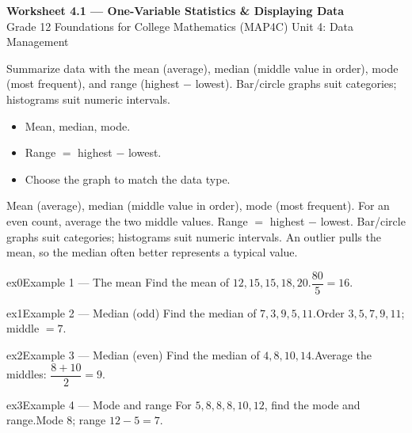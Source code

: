 \documentclass[11pt]{article}
\begin{document}
\begin{center}
{\LARGE\bfseries\color{titleblue}Worksheet 4.1 --- One-Variable Statistics \& Displaying Data}\\[2pt]
{\small Grade 12 Foundations for College Mathematics (MAP4C) \textperiodcentered{} Unit 4: Data Management}
\end{center}

\begin{ideabox}
Summarize data with the mean (average), median (middle value in order), mode (most frequent), and range (highest $-$ lowest). Bar/circle graphs suit categories; histograms suit numeric intervals.
\begin{itemize}[leftmargin=*,itemsep=2pt]
  \item Mean, median, mode.
  \item Range $=$ highest $-$ lowest.
  \item Choose the graph to match the data type.
\end{itemize}
\end{ideabox}

\begin{learnbox}
Mean (average), median (middle value in order), mode (most frequent). For an even count, average the two middle values.
Range $=$ highest $-$ lowest. Bar/circle graphs suit categories; histograms suit numeric intervals.
An outlier pulls the mean, so the median often better represents a typical value.
\end{learnbox}


\begin{example}{ex0}{Example 1 --- The mean}
Find the mean of $12, 15, 15, 18, 20$.\soln $\dfrac{80}{5}=16$.
\end{example}

\begin{example}{ex1}{Example 2 --- Median (odd)}
Find the median of $7, 3, 9, 5, 11$.\soln Order $3,5,7,9,11$; middle $=7$.
\end{example}

\begin{example}{ex2}{Example 3 --- Median (even)}
Find the median of $4, 8, 10, 14$.\soln Average the middles: $\dfrac{8+10}{2}=9$.
\end{example}

\begin{example}{ex3}{Example 4 --- Mode and range}
For $5, 8, 8, 8, 10, 12$, find the mode and range.\soln Mode $8$; range $12-5=7$.
\end{example}
\end{document}

